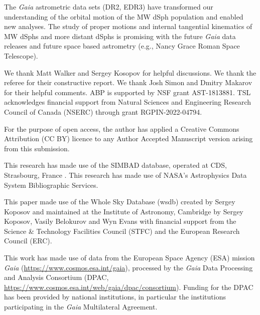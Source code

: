 \documentclass[twocolumn]{aastex63}
\begin{document}
The {\it Gaia} astrometric data sets (DR2, EDR3) have transformed our understanding of the orbital motion of the MW dSph population and enabled new analyses.
The study of proper motions and internal tangential kinematics of MW dSphs and more distant dSphs is promising with the future {\it Gaia} data releases and future space based astrometry (e.g., Nancy Grace Roman Space Telescope).  
 



\acknowledgments
We thank Matt Walker and Sergey Kosopov for helpful  discussions.
{We thank the referee for their constructive report. We thank Josh Simon and Dmitry Makarov for their helpful comments.}
ABP is supported by NSF grant AST-1813881.
TSL acknowledges financial support from Natural Sciences and Engineering Research Council
of Canada (NSERC) through grant
RGPIN-2022-04794.

For the purpose of open access, the author has applied a Creative Commons Attribution (CC BY) licence to any Author Accepted Manuscript version arising from this submission.


This research has made use of the SIMBAD database, operated at CDS, Strasbourg, France \citep{Simbad2000A&AS..143....9W}.
This research has made use of NASA’s Astrophysics Data System Bibliographic Services.

This paper made use of the Whole Sky Database (wsdb) created by Sergey Koposov and maintained at the Institute of Astronomy, Cambridge by Sergey Koposov, Vasily Belokurov and Wyn Evans with financial support from the Science \& Technology Facilities Council (STFC) and the European Research Council (ERC).

This work has made use of data from the European Space Agency (ESA) mission
{\it Gaia} (\url{https://www.cosmos.esa.int/gaia}), processed by the {\it Gaia}
Data Processing and Analysis Consortium (DPAC,
\url{https://www.cosmos.esa.int/web/gaia/dpac/consortium}). Funding for the DPAC
has been provided by national institutions, in particular the institutions
participating in the {\it Gaia} Multilateral Agreement.
\end{document}
